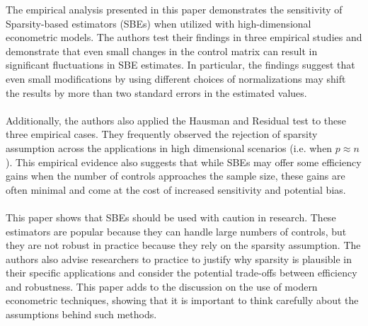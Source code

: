 The empirical analysis presented in this paper demonstrates the sensitivity of Sparsity-based estimators (SBEs) when utilized with high-dimensional econometric models. The authors test their findings in three empirical studies and demonstrate that even small changes in the control matrix can result in significant fluctuations in SBE estimates. In particular, the findings suggest that even small modifications by using different choices of normalizations may shift the results by more than two standard errors in the estimated values. \\
\\
Additionally, the authors also applied the Hausman and Residual test to these three empirical cases. They frequently observed the rejection of sparsity assumption across the applications in high dimensional scenarios (i.e. when $p \approx n$). This empirical evidence also suggests that while SBEs may offer some efficiency gains when the number of controls approaches the sample size, these gains are often minimal and come at the cost of increased sensitivity and potential bias.\\
\\
This paper shows that SBEs should be used with caution in research. These estimators are popular because they can handle large numbers of controls, but they are not robust in practice because they rely on the sparsity assumption. The authors also advise researchers to practice to justify why sparsity is plausible in their specific applications and consider the potential trade-offs between efficiency and robustness. This paper adds to the discussion on the use of modern econometric techniques, showing that it is important to think carefully about the assumptions behind such methods.
